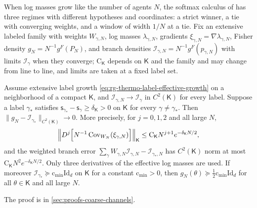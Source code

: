 When log masses grow like the number of agents $N$, the softmax calculus of
 has three regimes with different hypotheses and
coordinates: a strict winner, a tie with converging weights, and a window of width $1/N$ at a tie.
Fix an extensive labeled family with weights $W_{\gamma,N}$, log masses
$\lambda_{\gamma,N}$, gradients $\xi_{\gamma,N}=\nabla\lambda_{\gamma,N}$, Fisher density
$g_N=N^{-1}g^F(P_N)$, and branch densities $\mathcal I_{\gamma,N}=N^{-1}g^F(p_{\gamma,N})$ with limits
$\mathcal I_\gamma$ when they converge; $\mathrm C_{\mathsf K}$ depends on $\mathsf K$ and the family
and may change from line to line, and limits are taken at a fixed label set.

\label{eq:rg-thermo-label-strict-limit}
\label{eq:rg-thermo-label-native-floor-input}
\label{eq:rg-thermo-label-weight-first}
\label{eq:rg-thermo-label-mean-derivative}
\label{eq:rg-thermo-label-weight-second}
\label{eq:rg-thermo-label-losing-derivatives}
\label{eq:rg-thermo-label-strict-centered-covariance}
\label{eq:rg-thermo-label-strict-branch-error}
Assume extensive label growth \eqref{eq:rg-thermo-label-effective-growth} on a neighborhood of a
compact $\mathsf K$, and $\mathcal I_{\gamma,N}\to\mathcal I_\gamma$ in $C^2(\mathsf K)$ for every
label. Suppose a label $\gamma_*$ satisfies
$\mathsf s_{\gamma_*}-\mathsf s_\gamma\geq\delta_{\mathsf K}>0$ on $\mathsf K$ for every
$\gamma\neq\gamma_*$. Then $\|g_N-\mathcal I_{\gamma_*}\|_{C^2(\mathsf K)}\to0$. More precisely, for
$j=0,1,2$ and all large $N$,
\begin{equation}
\Bigl\|D^j\Bigl[N^{-1}\operatorname{Cov}_{W_N}(\xi_{\gamma,N})\Bigr]\Bigr\|_{\mathsf K}
\leq\mathrm C_{\mathsf K}N^{j+1}e^{-\delta_{\mathsf K}N/2},
\label{eq:rg-thermo-label-strict-covariance-bound}
\end{equation}
and the weighted branch error $\sum_\gamma W_{\gamma,N}\mathcal I_{\gamma,N}-\mathcal I_{\gamma_*,N}$
has $C^2(\mathsf K)$ norm at most $\mathrm C_{\mathsf K}N^2e^{-\delta_{\mathsf K}N/2}$. Only three
derivatives of the effective log masses are used. If moreover
$\mathcal I_{\gamma_*}\succeq\mathrm c_{\min}\mathrm{Id}_d$ on $\mathsf K$ for a constant
$\mathrm c_{\min}>0$, then $g_N(\theta)\succeq\tfrac12\mathrm c_{\min}\mathrm{Id}_d$ for all
$\theta\in\mathsf K$ and all large $N$. 

The proof is in \cref{sec:proofs-coarse-channels}.


